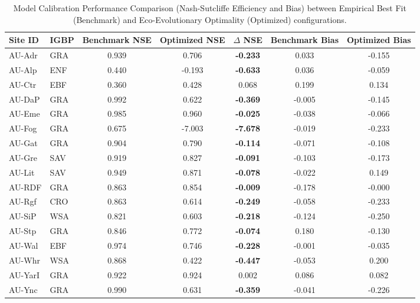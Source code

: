 \documentclass[11pt,a4paper]{article}
\begin{document}
\begin{table}[H]
\centering
\caption{Model Calibration Performance Comparison (Nash-Sutcliffe Efficiency and Bias) between Empirical Best Fit (Benchmark) and Eco-Evolutionary Optimality (Optimized) configurations.}
\label{tab:perf_comp}
\begin{tabular}{llccccc}
\toprule
Site ID & IGBP & Benchmark NSE & Optimized NSE & $\Delta$ NSE & Benchmark Bias & Optimized Bias \\
\midrule
AU-Adr & GRA & 0.939 & 0.706 & \textbf{-0.233} & 0.033 & -0.155 \\
AU-Alp & ENF & 0.440 & -0.193 & \textbf{-0.633} & 0.036 & -0.059 \\
AU-Ctr & EBF & 0.360 & 0.428 & 0.068 & 0.199 & 0.134 \\
AU-DaP & GRA & 0.992 & 0.622 & \textbf{-0.369} & -0.005 & -0.145 \\
AU-Eme & GRA & 0.985 & 0.960 & \textbf{-0.025} & -0.038 & -0.066 \\
AU-Fog & GRA & 0.675 & -7.003 & \textbf{-7.678} & -0.019 & -0.233 \\
AU-Gat & GRA & 0.904 & 0.790 & \textbf{-0.114} & -0.071 & -0.108 \\
AU-Gre & SAV & 0.919 & 0.827 & \textbf{-0.091} & -0.103 & -0.173 \\
AU-Lit & SAV & 0.949 & 0.871 & \textbf{-0.078} & -0.022 & 0.149 \\
AU-RDF & GRA & 0.863 & 0.854 & \textbf{-0.009} & -0.178 & -0.000 \\
AU-Rgf & CRO & 0.863 & 0.614 & \textbf{-0.249} & -0.058 & -0.233 \\
AU-SiP & WSA & 0.821 & 0.603 & \textbf{-0.218} & -0.124 & -0.250 \\
AU-Stp & GRA & 0.846 & 0.772 & \textbf{-0.074} & 0.180 & -0.130 \\
AU-Wal & EBF & 0.974 & 0.746 & \textbf{-0.228} & -0.001 & -0.035 \\
AU-Whr & WSA & 0.868 & 0.422 & \textbf{-0.447} & -0.053 & 0.200 \\
AU-YarI & GRA & 0.922 & 0.924 & 0.002 & 0.086 & 0.082 \\
AU-Ync & GRA & 0.990 & 0.631 & \textbf{-0.359} & -0.041 & -0.226 \\
\bottomrule
\end{tabular}
\end{table}
\end{document}
